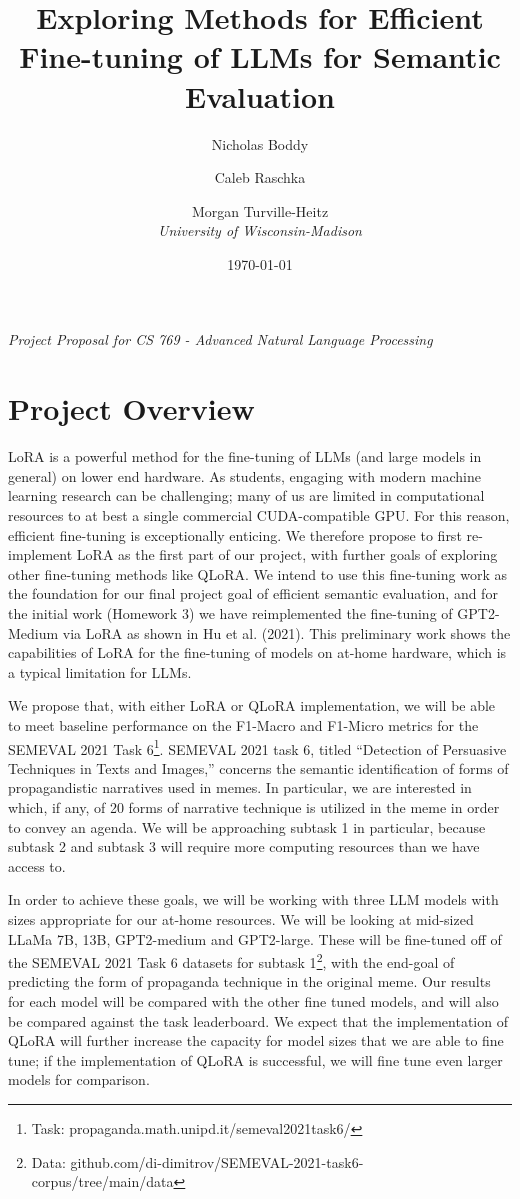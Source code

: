 \documentclass[11pt]{article}
\title{Exploring Methods for Efficient Fine-tuning of LLMs for Semantic Evaluation}
\author{
	Nicholas Boddy \and Caleb Raschka \and Morgan Turville-Heitz \\
	\textit{University of Wisconsin-Madison}
}
\date{\today}
\begin{document}
\maketitle

\begin{center}
	\textit{Project Proposal for CS 769 - Advanced Natural Language Processing}
\end{center}


\section{Project Overview}

LoRA is a powerful method for the fine-tuning of LLMs (and large models in general) on lower end hardware. As students, engaging with modern machine learning research can be challenging; many of us are limited in computational resources to at best a single commercial CUDA-compatible GPU. For this reason, efficient fine-tuning is exceptionally enticing. We therefore propose to first re-implement LoRA as the first part of our project, with further goals of exploring other fine-tuning methods like QLoRA. We intend to use this fine-tuning work as the foundation for our final project goal of efficient semantic evaluation, and for the initial work (Homework 3) we have reimplemented the fine-tuning of GPT2-Medium via LoRA as shown in Hu et al. (2021). This preliminary work shows the capabilities of LoRA for the fine-tuning of models on at-home hardware, which is a typical limitation for LLMs. 

We propose that, with either LoRA or QLoRA implementation, we will be able to meet baseline performance on the F1-Macro and F1-Micro metrics for the SEMEVAL 2021 Task 6\footnote{Task: propaganda.math.unipd.it/semeval2021task6/}. SEMEVAL 2021 task 6, titled “Detection of Persuasive Techniques in Texts and Images,” concerns the semantic identification of forms of propagandistic narratives used in memes. In particular, we are interested in which, if any, of 20 forms of narrative technique is utilized in the meme in order to convey an agenda. We will be approaching subtask 1 in particular, because subtask 2 and subtask 3 will require more computing resources than we have access to.  

In order to achieve these goals, we will be working with three LLM models with sizes appropriate for our at-home resources. We will be looking at mid-sized LLaMa 7B, 13B, GPT2-medium and GPT2-large. These will be fine-tuned off of the SEMEVAL 2021 Task 6 datasets for subtask 1\footnote{Data: github.com/di-dimitrov/SEMEVAL-2021-task6-corpus/tree/main/data}, with the end-goal of predicting the form of propaganda technique in the original meme. Our results for each model will be compared with the other fine tuned models, and will also be compared against the task leaderboard. We expect that the implementation of QLoRA will further increase the capacity for model sizes that we are able to fine tune; if the implementation of QLoRA is successful, we will fine tune even larger models for comparison.
\end{document}

